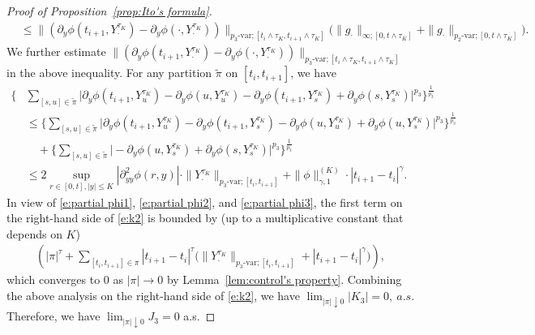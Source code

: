 \documentclass[10pt,a4paper]{amsart}
\begin{document}
\begin{proof}[Proof of Proposition~\ref{prop:Ito's formula}]
\begin{align}
\nonumber
& \le \big\|(\partial_{y}\phi(t_{i+1},Y^{\tau_{K}}_{\cdot}) - \partial_{y}\phi(\cdot,Y^{\tau_{K}}_{\cdot}))\big\|_{p_{3}\text{-var};[t_{i}\land\tau_{K},t_{i+1}\land\tau_{K}]}\Big(\|g_{\cdot}\|_{\infty ;[0,t\land\tau_{K}]}  + \|g_{\cdot}\|_{p_{2}\text{-var} ;[0,t\land\tau_{K}]} \Big).
\end{align}
We further estimate $	\big\|(\partial_{y}\phi(t_{i+1},Y^{\tau_{K}}_{\cdot}) - \partial_{y}\phi(\cdot,Y^{\tau_{K}}_{\cdot}))\big\|_{p_{3}\text{-var};[t_{i}\land\tau_{K},t_{i+1}\land\tau_{K}]}$ in the above inequality.  For any partition $\tilde \pi$ on $[t_i, t_{i+1}]$, we have
\begin{equation}\label{e:partial phi3}
\begin{aligned}
\bigg\{&\sum_{[s,u]\in \tilde \pi}\Big|\partial_{y}\phi(t_{i+1},Y^{\tau_{K}}_{u}) - \partial_{y}\phi(u,Y^{\tau_{K}}_{u}) - \partial_{y}\phi(t_{i+1},Y^{\tau_{K}}_{s}) + \partial_{y}\phi(s,Y^{\tau_{K}}_{s})\Big|^{p_{3}}\bigg\}^{\frac{1}{p_{3}}}\\
&\le \bigg\{\sum_{[s,u]\in \tilde \pi}\Big|\partial_{y}\phi(t_{i+1},Y^{\tau_{K}}_{u}) - \partial_{y}\phi(t_{i+1},Y^{\tau_{K}}_{s}) - \partial_{y}\phi(u,Y^{\tau_{K}}_{u}) + \partial_{y}\phi(u,Y^{\tau_{K}}_{s})\Big|^{p_{3}}\bigg\}^{\frac{1}{p_{3}}}\\
&\quad+ \bigg\{\sum_{[s,u]\in \tilde \pi}\Big|-\partial_{y}\phi(u,Y^{\tau_{K}}_{s}) + \partial_{y}\phi(s,Y^{\tau_{K}}_{s})\Big|^{p_{3}}\bigg\}^{\frac{1}{p_{3}}}\\
&\le 2\sup_{r\in[0,t],|y|\le K}|\partial^{2}_{yy}\phi(r,y)|\cdot \|Y^{\tau_{K}}_{\cdot}\|_{p_{3}\text{-var};[t_{i},t_{i+1}]} + \|\phi\|^{(K)}_{\gamma,1}\cdot |t_{i+1}-t_{i}|^{\gamma}.
\end{aligned}
\end{equation}
In view of \eqref{e:partial phi1}, \eqref{e:partial phi2}, and \eqref{e:partial phi3}, the first term on the right-hand side of \eqref{e:k2} is bounded by (up to a multiplicative constant that depends on $K$)
\begin{align*}
\left(|\pi|^{\tau} +  \sum_{[t_{i},t_{i+1}]\in\pi}|t_{i+1}-t_{i}|^{\tau}\Big(\|Y^{\tau_{K}}_{\cdot}\|_{p_{3}\text{-var};[t_{i},t_{i+1}]} +|t_{i+1}-t_{i}|^{\gamma}\Big)\right),
\end{align*}
which converges to 0 as $|\pi|\to0$ by Lemma~\ref{lem:control's property}.  
Combining the above analysis on the right-hand side of \eqref{e:k2}, we have
$\lim_{|\pi|\downarrow 0}|K_{3}|  = 0,\  a.s.$ Therefore, we have $\lim_{|\pi|\downarrow 0} J_3 = 0$ a.s.


\end{proof}
\end{document}
